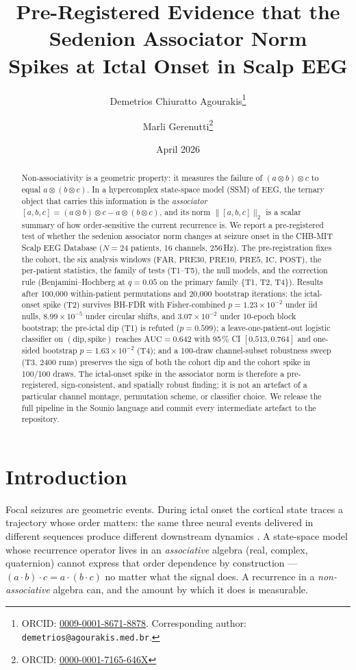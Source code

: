 \documentclass[11pt,twocolumn]{article}
\title{Pre-Registered Evidence that the Sedenion Associator Norm\\
Spikes at Ictal Onset in Scalp EEG}
\author[1,2]{Demetrios Chiuratto Agourakis\thanks{ORCID: \href{https://orcid.org/0009-0001-8671-8878}{0009-0001-8671-8878}. Corresponding author: \texttt{demetrios@agourakis.med.br}.}}
\author[1]{Marli Gerenutti\thanks{ORCID: \href{https://orcid.org/0000-0001-7165-646X}{0000-0001-7165-646X}}}
\affil[1]{Pontif\'icia Universidade Cat\'olica de S\~ao Paulo (PUC-SP), Sorocaba, Brazil}
\affil[2]{Faculdade S\~ao Leopoldo Mandic --- Campinas, Brazil}
\date{April 2026}
\begin{document}
\maketitle

\begin{abstract}
Non-associativity is a geometric property: it measures the failure of
$(a\otimes b)\otimes c$ to equal $a\otimes(b\otimes c)$. In a hypercomplex
state-space model (SSM) of EEG, the ternary object that carries this
information is the \emph{associator}
$[a,b,c]=(a\otimes b)\otimes c-a\otimes(b\otimes c)$, and its norm
$\|[a,b,c]\|_2$ is a scalar summary of how order-sensitive the current
recurrence is. We report a pre-registered test of whether the sedenion
associator norm changes at seizure onset in the CHB-MIT Scalp EEG
Database ($N=24$ patients, 16 channels, 256\,Hz). The pre-registration
fixes the cohort, the six analysis windows ($\mathrm{FAR},\,\mathrm{PRE30},\,
\mathrm{PRE10},\,\mathrm{PRE5},\,\mathrm{IC},\,\mathrm{POST}$), the
per-patient statistics, the family of tests (T1--T5), the null models,
and the correction rule (Benjamini--Hochberg at $q=0.05$ on the primary
family \{T1, T2, T4\}). Results after 100{,}000 within-patient
permutations and 20{,}000 bootstrap iterations: the ictal-onset spike
(T2) survives BH-FDR with Fisher-combined $p=1.23\times10^{-2}$ under
iid nulls, $8.99\times10^{-5}$ under circular shifts, and
$3.07\times10^{-2}$ under 10-epoch block bootstrap; the pre-ictal dip
(T1) is refuted ($p=0.599$); a leave-one-patient-out logistic
classifier on $(\mathrm{dip},\mathrm{spike})$ reaches
$\mathrm{AUC}=0.642$ with 95\,\% CI $[0.513,0.764]$ and one-sided
bootstrap $p=1.63\times10^{-2}$ (T4); and a 100-draw channel-subset
robustness sweep (T3, 2400 runs) preserves the sign of both the cohort
dip and the cohort spike in 100/100 draws. The ictal-onset spike in the
associator norm is therefore a pre-registered, sign-consistent, and
spatially robust finding; it is not an artefact of a particular channel
montage, permutation scheme, or classifier choice. We release the full
pipeline in the Sounio language and commit every intermediate artefact
to the repository.
\end{abstract}

\section{Introduction}

Focal seizures are geometric events. During ictal onset the cortical
state traces a trajectory whose order matters: the same three neural
events delivered in different sequences produce different downstream
dynamics \cite{lopes2003model,jirsa2014nature}. A state-space model
whose recurrence operator lives in an \emph{associative} algebra
(real, complex, quaternion) cannot express that order dependence by
construction --- $(a\cdot b)\cdot c=a\cdot(b\cdot c)$ no matter what the
signal does. A recurrence in a \emph{non-associative} algebra can, and
the amount by which it does is measurable.
\end{document}
